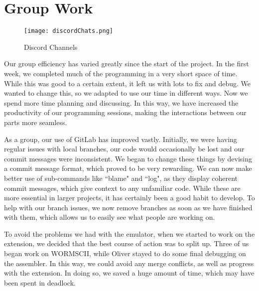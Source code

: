 \documentclass[]{article}
\begin{document}
\newpage

\section*{Group Work}

\vspace{3mm}
\begin{wrapfigure}[32]{L}{0.30\textwidth}
\centering
    \centering
\vspace{-3mm}
\texttt{[image: discordChats.png]}
\vspace{1mm}
  \caption{\label{fig3 :}Discord Channels}
    \vspace{-2mm}
\end{wrapfigure}

Our group efficiency has varied greatly since the start of the project. In the first week, we completed much of the programming in a very short space of time. While this was good to a certain extent, it left us with lots to fix and debug. We wanted to change this, so we adapted to use our time in different ways. Now we spend more time planning and discussing.  In this way, we have increased the productivity of our programming sessions, making the interactions between our parts more seamless. 


\vspace{3mm}

As a group, our use of GitLab has improved vastly. Initially, we were having regular issues with local branches, our code would occasionally be lost and our commit messages were inconsistent. We began to change these things by devising a commit message format, which proved to be very rewarding. We can now make better use of sub-commands like ``blame" and ``log", as they display coherent commit messages, which give context to any unfamiliar code. While these are more essential in larger projects, it has certainly been a good habit to develop. To help with our branch issues, we now remove branches as soon as we have finished with them, which allows us to easily see what people are working on.

\vspace{3mm}

To avoid the problems we had with the emulator, when we started to work on the extension, we decided that the best course of action was to split up. Three of us began work on WORMSCII, while Oliver stayed to do some final debugging on the assembler. In this way, we could avoid any merge conflicts, as well as progress with the extension. In doing so, we saved a huge amount of time, which may have been spent in deadlock.
\end{document}
